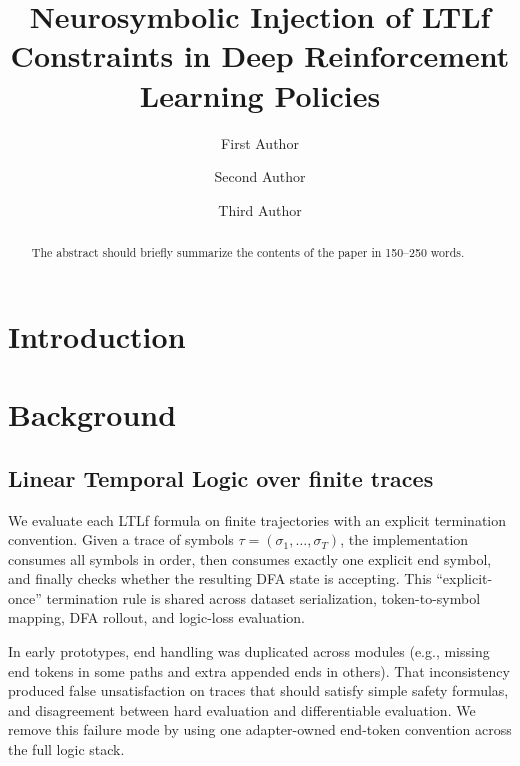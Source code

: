 \documentclass[runningheads]{llncs}
\begin{document}
%
\title{Neurosymbolic Injection of LTLf Constraints in Deep Reinforcement Learning Policies}
%
%
\author{First Author \and
Second Author \and
Third Author}
%
%
%
\maketitle              %
%
\begin{abstract}
The abstract should briefly summarize the contents of the paper in
150--250 words.

\end{abstract}
%
%
%
\section*{Introduction}
\section{Background}
\subsection{Linear Temporal Logic over finite traces}
We evaluate each LTLf formula on finite trajectories with an explicit termination convention. Given a trace of symbols $\tau=(\sigma_1,\ldots,\sigma_T)$, the implementation consumes all symbols in order, then consumes exactly one explicit end symbol, and finally checks whether the resulting DFA state is accepting. This ``explicit-once'' termination rule is shared across dataset serialization, token-to-symbol mapping, DFA rollout, and logic-loss evaluation.

In early prototypes, end handling was duplicated across modules (e.g., missing end tokens in some paths and extra appended ends in others). That inconsistency produced false unsatisfaction on traces that should satisfy simple safety formulas, and disagreement between hard evaluation and differentiable evaluation. We remove this failure mode by using one adapter-owned end-token convention across the full logic stack.
\end{document}
